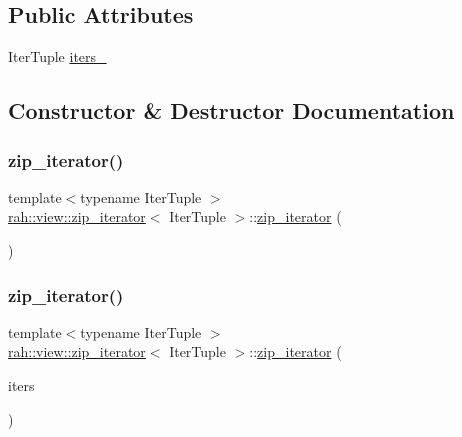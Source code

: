 \subsection*{Public Attributes}
\begin{DoxyCompactItemize}
\item 
Iter\+Tuple \mbox{\hyperlink{structrah_1_1view_1_1zip__iterator_a58f5f6dd935fe51dd3c3a28e3b06ecc9}{iters\+\_\+}}
\end{DoxyCompactItemize}


\subsection{Constructor \& Destructor Documentation}
\mbox{\label{structrah_1_1view_1_1zip__iterator_a8ba7af8259dc507b57d1e3371c7f40a2}} 
\subsubsection{\texorpdfstring{zip\_iterator()}{zip\_iterator()}\hspace{0.1cm}{\footnotesize\ttfamily [1/2]}}
{\footnotesize\ttfamily template$<$typename Iter\+Tuple $>$ \\
\mbox{\hyperlink{structrah_1_1view_1_1zip__iterator}{rah\+::view\+::zip\+\_\+iterator}}$<$ Iter\+Tuple $>$\+::\mbox{\hyperlink{structrah_1_1view_1_1zip__iterator}{zip\+\_\+iterator}} (\begin{DoxyParamCaption}{ }\end{DoxyParamCaption})\hspace{0.3cm}{\ttfamily [default]}}

\mbox{\label{structrah_1_1view_1_1zip__iterator_a2f6b7c790bcb819a68e4828f6bd6ef79}} 
\subsubsection{\texorpdfstring{zip\_iterator()}{zip\_iterator()}\hspace{0.1cm}{\footnotesize\ttfamily [2/2]}}
{\footnotesize\ttfamily template$<$typename Iter\+Tuple $>$ \\
\mbox{\hyperlink{structrah_1_1view_1_1zip__iterator}{rah\+::view\+::zip\+\_\+iterator}}$<$ Iter\+Tuple $>$\+::\mbox{\hyperlink{structrah_1_1view_1_1zip__iterator}{zip\+\_\+iterator}} (\begin{DoxyParamCaption}\item[{Iter\+Tuple const \&}]{iters }\end{DoxyParamCaption})\hspace{0.3cm}{\ttfamily [inline]}}



